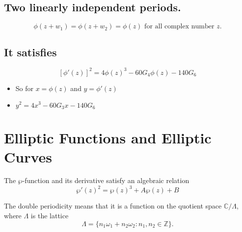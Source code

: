 \subsection*{Two linearly independent periods.}
\[
\phi(z + w_1) = \phi(z + w_2) = \phi(z) \text{ for all complex number } z.
\]

\subsection*{It satisfies}
\[
[\phi'(z)]^2 = 4\phi(z)^3 - 60 G_4 \phi(z) - 140 G_6
\]

\begin{itemize}
	\item So for $x=\phi(z)$ and $y=\phi'(z)$
	\item $y^2=4x^3-60G_3x-140G_6$
\end{itemize}


\newpage
\section*{Elliptic Functions and Elliptic Curves}

The \(\wp\)-function and its derivative satisfy an algebraic relation
\[
\wp'(z)^2 = \wp(z)^3 + A \wp(z) + B
\]

The double periodicity means that it is a function on the quotient space \(\mathbb{C}/\Lambda\), where \(\Lambda\) is the lattice
\[
\Lambda = \{ n_1\omega_1 + n_2\omega_2 : n_1,n_2\in\mathbb{Z}\}.
\]
\vspace{8pt}
\begin{center}
\end{center}
